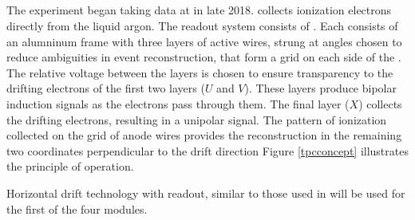 \documentclass[../main-v1.tex]{subfiles}
\begin{document}
\subsection{} %
The  experiment began taking data at  in late 2018.   %
collects ionization electrons %
directly from the liquid argon. The readout system consists of  %
.
Each  consists of an alumninum frame with three layers of active wires, strung at angles chosen to reduce ambiguities in event reconstruction, that form a grid on each side of the . The relative voltage between the layers is chosen to ensure transparency to the drifting electrons of the first two layers ($U$ and $V$). These layers produce bipolar induction signals as the electrons pass through them. The final layer ($X$) collects the drifting electrons, resulting in a unipolar signal. The pattern of ionization collected on the grid of anode wires provides the reconstruction in the remaining two coordinates perpendicular to the drift direction 
Figure \ref{tpcconcept} illustrates the principle of operation. %

Horizontal drift  technology with  readout, similar to those used in   will be used for the first of the four  modules. 
\end{document}
